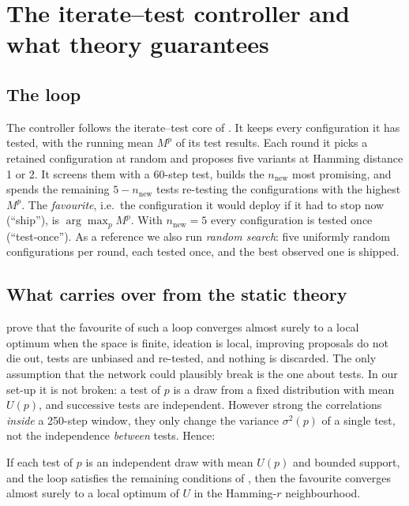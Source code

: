 \section{The iterate--test controller and what theory guarantees}
\label{sec:theory}

\subsection{The loop}
The controller follows the iterate--test core of \citet{kuras2026when}. It keeps every configuration it has tested, with the running mean $M^p$ of its test results. Each round it picks a retained configuration at random and proposes five variants at Hamming distance 1 or 2. It screens them with a 60-step test, builds the $n_{\text{new}}$ most promising, and spends the remaining $5-n_{\text{new}}$ tests re-testing the configurations with the highest $M^p$. The \emph{favourite}, i.e.\ the configuration it would deploy if it had to stop now (``ship''), is $\arg\max_p M^p$. With $n_{\text{new}}=5$ every configuration is tested once (``test-once''). As a reference we also run \emph{random search}: five uniformly random configurations per round, each tested once, and the best observed one is shipped.

\subsection{What carries over from the static theory}
\citet{kuras2026when} prove that the favourite of such a loop converges almost surely to a local optimum when the space is finite, ideation is local, improving proposals do not die out, tests are unbiased and re-tested, and nothing is discarded. The only assumption that the network could plausibly break is the one about tests. In our set-up it is not broken: a test of $p$ is a draw from a fixed distribution with mean $U(p)$, and successive tests are independent. However strong the correlations \emph{inside} a 250-step window, they only change the variance $\sigma^2(p)$ of a single test, not the independence \emph{between} tests. Hence:

\begin{proposition}\label{prop:carry}
If each test of $p$ is an independent draw with mean $U(p)$ and bounded support, and the loop satisfies the remaining conditions of \citet{kuras2026when}, then the favourite converges almost surely to a local optimum of $U$ in the Hamming-$r$ neighbourhood.
\end{proposition}

